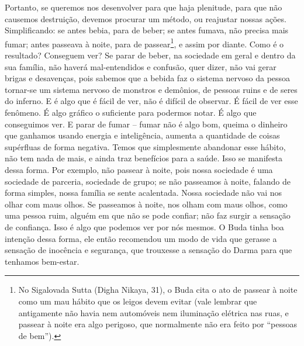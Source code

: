 Portanto, se queremos nos desenvolver
para que haja plenitude, para que não causemos destruição, devemos
procurar um método, ou reajustar nossas ações. Simplificando: se antes
bebia, para de beber; se antes fumava, não precisa mais fumar; antes
passeava à noite, para de passear\footnote{No Sigalovada Sutta (Digha
Nikaya, 31), o Buda cita o ato de passear à noite como um mau hábito
que os leigos devem evitar (vale lembrar que antigamente não havia nem
automóveis nem iluminação elétrica nas ruas, e passear à noite era algo
perigoso, que normalmente não era feito por “pessoas de bem”).}, e
assim por diante. Como é o resultado? Conseguem ver? Se parar de beber,
na sociedade em geral e dentro da sua família, não haverá
mal-entendidos e confusão, quer dizer, não vai gerar brigas e
desavenças, pois sabemos que a bebida faz o sistema nervoso da pessoa
tornar-se um sistema nervoso de monstros e demônios, de pessoas ruins e
de seres do inferno. E é algo que é fácil de ver, não é difícil de
observar. É fácil de ver esse fenômeno. É algo
gráfico o suficiente para podermos notar. É
algo que conseguimos ver. E parar de fumar – fumar não é algo bom,
queima o dinheiro que ganhamos usando energia e inteligência, aumenta a
quantidade de coisas supérfluas de forma negativa. Temos que
simplesmente abandonar esse hábito, não tem nada de
mais, e ainda traz benefícios para a saúde.
Isso se manifesta dessa forma. Por exemplo, não passear à noite, pois
nossa sociedade é uma sociedade de parceria, sociedade de grupo; se não
passeamos à noite, falando de forma simples, nossa família se sente
acalentada. Nossa sociedade não vai nos olhar com maus olhos. Se
passeamos à noite, nos olham com maus olhos, como uma pessoa ruim,
alguém em que não se pode confiar; não faz surgir a sensação de
confiança. Isso é algo que podemos ver por
nós mesmos. O Buda tinha boa intenção dessa
forma, ele então recomendou um modo de vida que gerasse a sensação de
inocência e segurança, que trouxesse a sensação do Darma para que
tenhamos bem-estar. 

